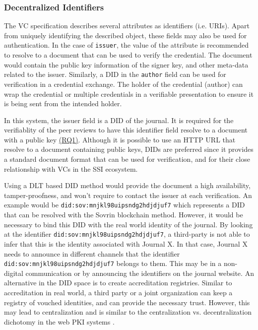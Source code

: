 \subsubsection{Decentralized Identifiers}

The \acrshort{VC} specification describes several attributes as identifiers (i.e. \acrshort{URI}s). Apart from uniquely identifying the described object, these fields may also be used for authentication. In the case of \lstinline{issuer}, the value of the attribute is recommended to resolve to a document that can be used to verify the credential. The document would contain the public key information of the signer key, and other meta-data related to the issuer. Similarly, a \acrshort{DID} in the \lstinline{author} field can be used for verification in a credential exchange. The holder of the credential (author) can wrap the credential or multiple credentials in a verifiable presentation to ensure it is being sent from the intended holder. 

In this system, the issuer field is a \acrshort{DID} of the journal. It is required for the verifiablity of the peer reviews to have this identifier field resolve to a document with a public key \hyperref[rq:verifiable]{(RQ1)}. Although it is possible to use an \acrshort{HTTP} \acrshort{URL} that resolve to a document containing public keys, \acrshort{DID}s are preferred since it provides a standard document format that can be used for verification, and for their close relationship with \acrshort{VC}s in the \acrshort{SSI} ecosystem. 

Using a \acrshort{DLT} based \acrshort{DID} method would provide the document a high availability, tamper-proofness, and won't require to contact the issuer at each verification. An example would be \lstinline{did:sov:mnjkl98uipsndg2hdjdjuf7} which represents a DID that can be resolved with the Sovrin blockchain method. However, it would be necessary to bind this \acrshort{DID} with the real world identity of the journal. By looking at the identifier \lstinline{did:sov:mnjkl98uipsndg2hdjdjuf7}, a third-party is not able to infer that this is the identity associated with Journal X. In that case, Journal X needs to announce in different channels that the identifier \lstinline{did:sov:mnjkl98uipsndg2hdjdjuf7} belongs to them. This may be in a non-digital communication or by announcing the identifiers on the journal website. An alternative in the \acrshort{DID} space is to create accreditation registries. Similar to accreditation in real world, a third party or a joint organization can keep a registry of vouched identities, and can provide the necessary trust. However, this may lead to centralization and is similar to the centralization vs. decentralization dichotomy in the web \acrshort{PKI} systems \parencite{Perlman1999}.


